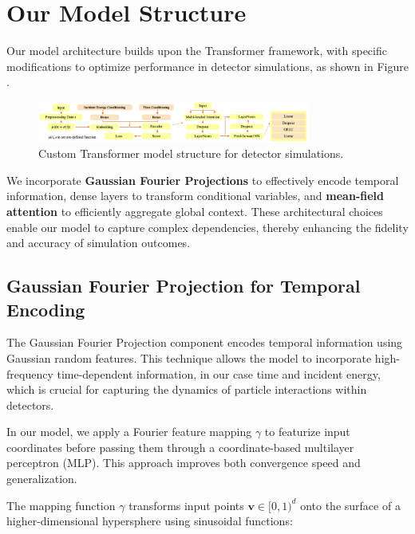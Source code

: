 
\section{Our Model Structure}
Our model architecture builds upon the Transformer framework, with specific modifications to optimize performance in detector simulations, as shown in Figure .

\begin{figure}[ht]
    \centering
    \includegraphics[width=0.8\textwidth]{Figures/model_structure.png}
    \caption{Custom Transformer model structure for detector simulations.}
    \label{fig:model_structure}

\end{figure}
We incorporate \textbf{Gaussian Fourier Projections} \cite{tancik_fourier_2020} to effectively encode temporal information, dense layers to transform conditional variables, and \textbf{mean-field attention} \cite{kach_pay_2024} to efficiently aggregate global context. These architectural choices enable our model to capture complex dependencies, thereby enhancing the fidelity and accuracy of simulation outcomes.

\subsection{Gaussian Fourier Projection for Temporal Encoding}
The Gaussian Fourier Projection component encodes temporal information using Gaussian random features. This technique allows the model to incorporate high-frequency time-dependent information, in our case time and incident energy, which is crucial for capturing the dynamics of particle interactions within detectors.

In our model, we apply a Fourier feature mapping \( \gamma \) to featurize input coordinates before passing them through a coordinate-based multilayer perceptron (MLP). This approach improves both convergence speed and generalization.

The mapping function \( \gamma \) transforms input points \( \mathbf{v} \in [0, 1)^d \) onto the surface of a higher-dimensional hypersphere using sinusoidal functions:

